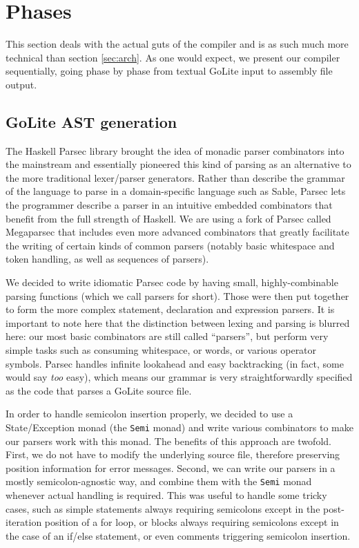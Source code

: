 \documentclass[letterpaper,11pt]{article}
\begin{document}
\section{Phases}
\label{sec:ph}

This section deals with the actual guts of the compiler and is as such much more technical than section \ref{sec:arch}. As one would expect, we present our compiler sequentially, going phase by phase from textual GoLite input to assembly file output.

\subsection{GoLite AST generation}
\label{sec:ph_parse}
The Haskell Parsec library brought the idea of monadic parser combinators into the mainstream and essentially pioneered this kind of parsing as an alternative to the more traditional lexer/parser generators. Rather than describe the grammar of the language to parse in a domain-specific language such as Sable, Parsec lets the programmer describe a parser in an intuitive embedded combinators that benefit from the full strength of Haskell. We are using a fork of Parsec called Megaparsec that includes even more advanced combinators that greatly facilitate the writing of certain kinds of common parsers (notably basic whitespace and token handling, as well as sequences of parsers).

We decided to write idiomatic Parsec code by having small, highly-combinable parsing functions (which we call parsers for short). Those were then put together to form the more complex statement, declaration and expression parsers. It is important to note here that the distinction between lexing and parsing is blurred here: our most basic combinators are still called ``parsers'', but perform very simple tasks such as consuming whitespace, or words, or various operator symbols. Parsec handles infinite lookahead and easy backtracking (in fact, some would say \emph{too} easy), which means our grammar is very straightforwardly specified as the code that parses a GoLite source file.

In order to handle semicolon insertion properly, we decided to use a State/Exception monad (the \texttt{Semi} monad) and write various combinators to make our parsers work with this monad. The benefits of this approach are twofold. First, we do not have to modify the underlying source file, therefore preserving position information for error messages. Second, we can write our parsers in a mostly semicolon-agnostic way, and combine them with the \texttt{Semi} monad whenever actual handling is required. This was useful to handle some tricky cases, such as simple statements always requiring semicolons except in the post-iteration position of a for loop, or blocks always requiring semicolons except in the case of an if/else statement, or even comments triggering semicolon insertion.
\end{document}
